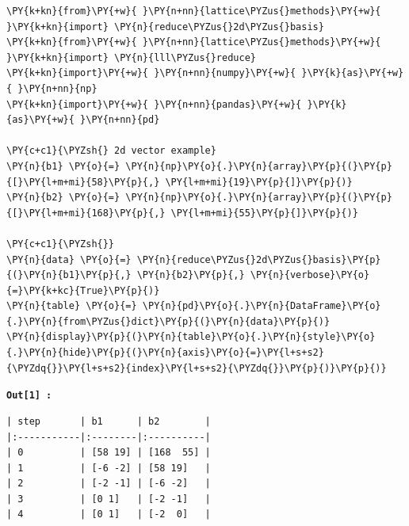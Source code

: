 \documentclass[a4paper,12pt]{article}
\begin{document}
    \begin{tcolorbox}[breakable, size=fbox, boxrule=1pt, pad at break*=1mm,colback=cellbackground, colframe=cellborder]
\begin{Verbatim}[commandchars=\\\{\}]
\PY{k+kn}{from}\PY{+w}{ }\PY{n+nn}{lattice\PYZus{}methods}\PY{+w}{ }\PY{k+kn}{import} \PY{n}{reduce\PYZus{}2d\PYZus{}basis}
\PY{k+kn}{from}\PY{+w}{ }\PY{n+nn}{lattice\PYZus{}methods}\PY{+w}{ }\PY{k+kn}{import} \PY{n}{lll\PYZus{}reduce}
\PY{k+kn}{import}\PY{+w}{ }\PY{n+nn}{numpy}\PY{+w}{ }\PY{k}{as}\PY{+w}{ }\PY{n+nn}{np}
\PY{k+kn}{import}\PY{+w}{ }\PY{n+nn}{pandas}\PY{+w}{ }\PY{k}{as}\PY{+w}{ }\PY{n+nn}{pd}

\PY{c+c1}{\PYZsh{} 2d vector example}
\PY{n}{b1} \PY{o}{=} \PY{n}{np}\PY{o}{.}\PY{n}{array}\PY{p}{(}\PY{p}{[}\PY{l+m+mi}{58}\PY{p}{,} \PY{l+m+mi}{19}\PY{p}{]}\PY{p}{)}
\PY{n}{b2} \PY{o}{=} \PY{n}{np}\PY{o}{.}\PY{n}{array}\PY{p}{(}\PY{p}{[}\PY{l+m+mi}{168}\PY{p}{,} \PY{l+m+mi}{55}\PY{p}{]}\PY{p}{)}

\PY{c+c1}{\PYZsh{}}
\PY{n}{data} \PY{o}{=} \PY{n}{reduce\PYZus{}2d\PYZus{}basis}\PY{p}{(}\PY{n}{b1}\PY{p}{,} \PY{n}{b2}\PY{p}{,} \PY{n}{verbose}\PY{o}{=}\PY{k+kc}{True}\PY{p}{)}
\PY{n}{table} \PY{o}{=} \PY{n}{pd}\PY{o}{.}\PY{n}{DataFrame}\PY{o}{.}\PY{n}{from\PYZus{}dict}\PY{p}{(}\PY{n}{data}\PY{p}{)}
\PY{n}{display}\PY{p}{(}\PY{n}{table}\PY{o}{.}\PY{n}{style}\PY{o}{.}\PY{n}{hide}\PY{p}{(}\PY{n}{axis}\PY{o}{=}\PY{l+s+s2}{\PYZdq{}}\PY{l+s+s2}{index}\PY{l+s+s2}{\PYZdq{}}\PY{p}{)}\PY{p}{)}
\end{Verbatim}
\end{tcolorbox}

\newpage



\begin{tcolorbox}[colback=white, colframe=gray!60, boxrule=0.5pt]
\texttt{\textbf{Out[1] :}}


      \begin{Verbatim}[commandchars=\\\{\}]
| step       | b1      | b2        |
|:-----------|:--------|:----------|
| 0          | [58 19] | [168  55] |
| 1          | [-6 -2] | [58 19]   |
| 2          | [-2 -1] | [-6 -2]   |
| 3          | [0 1]   | [-2 -1]   |
| 4          | [0 1]   | [-2  0]   |
    \end{Verbatim}

\end{tcolorbox}
  
\end{document}
